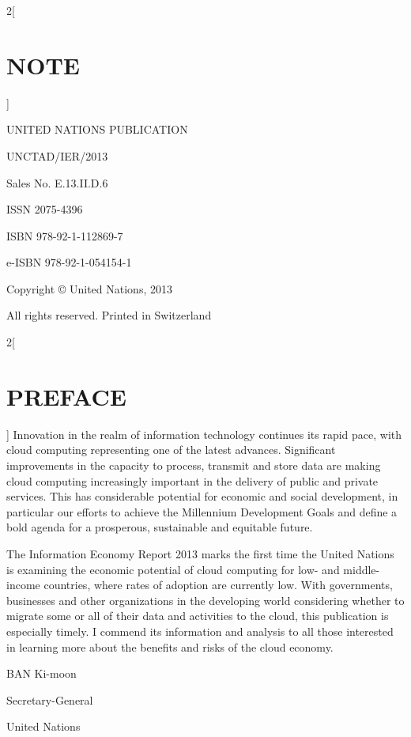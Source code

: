 \documentclass[a4paper, UTF8, 12pt]{article}
\begin{document}
\begin{paracol}{2}[\section{NOTE}]
    \begin{center}
        UNITED NATIONS PUBLICATION 

        UNCTAD/IER/2013 

        Sales No. E.13.II.D.6

        ISSN 2075-4396 

        ISBN 978-92-1-112869-7 

        e-ISBN 978-92-1-054154-1 

        Copyright © United Nations, 2013

        All rights reserved. Printed in Switzerland
    \end{center}

\end{paracol}
\begin{paracol}{2}[\section{PREFACE}]
    Innovation in the realm of information technology continues its rapid pace, with cloud computing representing one of the latest advances. Significant improvements in the capacity to process, transmit and store data are making cloud computing increasingly important in the delivery of public and private services. This has considerable potential for economic and social development, in particular our efforts to achieve the Millennium Development Goals and define a bold agenda for a prosperous, sustainable and equitable future. 

    The Information Economy Report 2013 marks the first time the United Nations is examining the economic potential of cloud computing for low- and middle-income countries, where rates of adoption are currently low. With governments, businesses and other organizations in the developing world considering whether to migrate some or all of their data and activities to the cloud, this publication is especially timely. I commend its information and analysis to all those interested in learning more about the benefits and risks of the cloud economy.
    \begin{center}
        BAN Ki-moon 
        
        Secretary-General
        
        United Nations
    \end{center}
    
\end{paracol}
\end{document}
